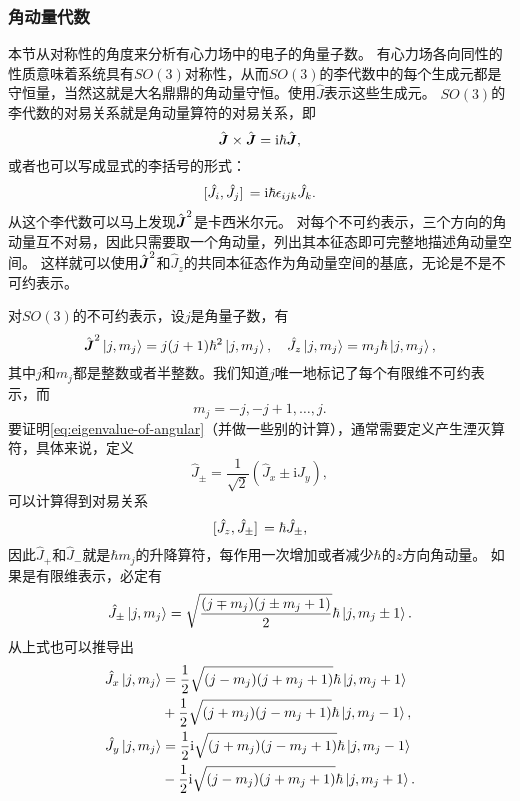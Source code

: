 \documentclass[UTF8, a4paper]{ctexart}
\newcommand*{\ii}{\mathrm{i}}
\begin{document}
\subsubsection{角动量代数}\label{sec:algebra-of-angular}

本节从对称性的角度来分析有心力场中的电子的角量子数。
有心力场各向同性的性质意味着系统具有$SO(3)$对称性，从而$SO(3)$的李代数中的每个生成元都是守恒量，当然这就是大名鼎鼎的角动量守恒。使用$\hat{J}$表示这些生成元。
$SO(3)$的李代数的对易关系就是角动量算符的对易关系，即
\begin{equation}
    \hat{\vb*{J}} \times \hat{\vb*{J}} = \ii \hbar \hat{\vb*{J}},
\end{equation}
或者也可以写成显式的李括号的形式：
\begin{equation}
    \comm*{\hat{J}_i}{\hat{J}_j} = \ii \hbar \epsilon_{ijk} \hat{J}_k.
\end{equation}
从这个李代数可以马上发现$\hat{\vb*{J}}^2$是卡西米尔元。
对每个不可约表示，三个方向的角动量互不对易，因此只需要取一个角动量，列出其本征态即可完整地描述角动量空间。
这样就可以使用$\hat{\vb*{J}}^2$和$\hat{J}_z$的共同本征态作为角动量空间的基底，无论是不是不可约表示。

对$SO(3)$的不可约表示，设$j$是角量子数，有
\begin{equation}
    \hat{\vb*{J}}^2 \ket{j,m_j} = j(j+1)\hbar^2 \ket{j,m_j}, \quad \hat{J}_z \ket{j,m_j} = m_j \hbar \ket{j,m_j},
    \label{eq:eigenvalue-of-angular}
\end{equation}
其中$j$和$m_j$都是整数或者半整数。我们知道$j$唯一地标记了每个有限维不可约表示，而
\begin{equation}
    m_j = -j, -j+1, \ldots, j.
\end{equation}
要证明\eqref{eq:eigenvalue-of-angular}（并做一些别的计算），通常需要定义产生湮灭算符，具体来说，定义
\begin{equation}
    \hat{J}_\pm = \frac{1}{\sqrt{2}} (\hat{J}_x \pm \ii \hat{J}_y),
\end{equation}
可以计算得到对易关系
\begin{equation}
    \comm*{\hat{J}_z}{\hat{J}_\pm} = \hbar \hat{J}_\pm,
\end{equation}
因此$\hat{J}_+$和$\hat{J}_-$就是$\hbar m_j$的升降算符，每作用一次增加或者减少$\hbar$的$z$方向角动量。
如果是有限维表示，必定有
\begin{equation}
    \hat{J}_\pm \ket{j, m_j} = \sqrt{\frac{(j \mp m_j)(j \pm m_j + 1)}{2}} \hbar \ket{j, m_j \pm 1}.
\end{equation}
从上式也可以推导出
\begin{equation}
    \begin{aligned}
        \hat{J}_x \ket{j, m_j} &= \frac{1}{2} \sqrt{(j-m_j)(j+m_j+1)} \hbar \ket{j, m_j+1} \\
        &+ \frac{1}{2} \sqrt{(j+m_j)(j-m_j+1)} \hbar \ket{j, m_j-1} , \\
        \hat{J}_y \ket{j, m_j} &= \frac{1}{2} \ii \sqrt{(j+m_j)(j-m_j+1)} \hbar \ket{j, m_j-1} \\
        &- \frac{1}{2} \ii \sqrt{(j-m_j)(j+m_j+1)} \hbar \ket{j, m_j+1}.
    \end{aligned}
    \label{eq:apply-jx-jy-to-angular-state}
\end{equation}
\end{document}
